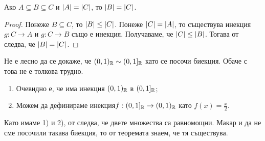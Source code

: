 \begin{cor}
  Ако $A \subseteq B \subseteq C$ и $\lvert{A}\rvert = \lvert{C}\rvert$, то $\lvert{B}\rvert = \lvert{C}\rvert$.
\end{cor}
\begin{proof}
  Понеже $B \subseteq C$, то $\lvert{B}\rvert \leq \lvert{C}\rvert$.
  Понеже $\lvert{C}\rvert = \lvert{A}\rvert$, то съществува инекция $g:C \to A$ и $g:C\to B$ също е инекция.
  Получаваме, че $\lvert{C}\rvert \leq \lvert{B}\rvert$.
  Тогава от  следва, че $\lvert{B}\rvert = \lvert{C}\rvert$.
\end{proof}

\begin{example}
  Не е лесно да се докаже, че $(0,1)_{\mathbb{R}} \sim (0,1]_{\mathbb{R}}$ като се посочи биекция.
  Обаче с  това не е толкова трудно.
  \begin{enumerate}[1)]
  \item 
    Очевидно е, че има инекция $(0,1)_{\mathbb{R}}$ в $(0,1]_{\mathbb{R}}$;
  \item
    Можем да дефинираме инекция$f:(0,1]_{\mathbb{R}} \to (0,1)_{\mathbb{R}}$
    като $f(x) = \frac{x}{2}$.    
  \end{enumerate}
  Като имаме 1) и 2), от  следва, че двете множества са равномощни.
  Макар и да не сме посочили такава биекция, то от теоремата знаем, че тя съществува.  
\end{example}



